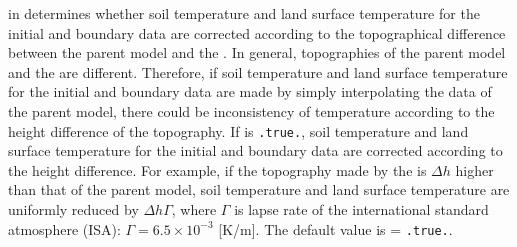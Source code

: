  in  determines
whether soil temperature and land surface temperature for the initial and boundary data are corrected
according to the topographical difference between the parent model and the \scalerm.
In general, topographies of the parent model and the \scalerm are different.
Therefore, if soil temperature and land surface temperature for the initial and boundary data are made by simply interpolating the data of the parent model,
there could be inconsistency of temperature according to the height difference of the topography.
If  is \verb|.true.|,
soil temperature and land surface temperature for the initial and boundary data are corrected according to the height difference.
For example, if the topography made by the \scalerm is $\Delta h$ higher than that of the parent model,
soil temperature and land surface temperature are uniformly reduced by $\Delta h\Gamma$,
where $\Gamma$ is lapse rate of the international standard atmosphere (ISA): $\Gamma=6.5\times 10^{-3}$ [K/m].
The default value is  = \verb|.true.|.



